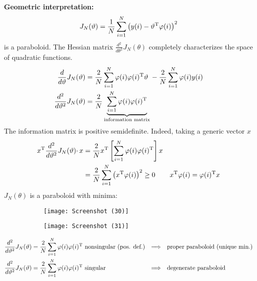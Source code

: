 \textbf{Geometric interpretation:}
\begin{equation*}
J_{N}(\vartheta) =\frac{1}{N}\sum _{i=1}^{N}\left(y(i) -\vartheta ^{\mathrm{T}} \varphi (i)\right)^{2}
\end{equation*}
is a paraboloid. The Hessian matrix $ \frac{d^{2}}{d\theta ^{2}} J_{N}(\theta)$ completely characterizes the space of quadratic functions.
\begin{align*}
\frac{d}{d\vartheta } J_{N}(\vartheta) & =\frac{2}{N}\sum _{i=1}^{N} \varphi (i) \varphi (i)^{\mathrm{T}} \vartheta \ -\frac{2}{N}\sum _{i=1}^{N} \varphi (i) y(i)\\
\frac{d^{2}}{d\vartheta ^{2}} J_{N}(\vartheta) & =\frac{2}{N}\underbrace{\sum _{i=1}^{N} \varphi (i) \varphi (i)^{\mathrm{T}}}_{\text{information matrix}}
\end{align*}
The information matrix is positive semidefinite. Indeed, taking a generic vector $x$
\begin{align*}
x^{\mathrm{T}}\frac{d^{2}}{d\vartheta ^{2}} J_{N}(\vartheta) \cdotp x & =\frac{2}{N} x^{\mathrm{T}}\left[\sum _{i=1}^{N} \varphi (i) \varphi (i)^{\mathrm{T}}\right] x & \\
 & =\frac{2}{N}\sum _{i=1}^{N}\left(x^{\mathrm{T}} \varphi (i)\right)^{2} \geq 0 & x^{\mathrm{T}} \varphi (i) =\varphi (i)^{\mathrm{T}} x
\end{align*}
$ J_{N}(\theta)$ is a paraboloid with minima:
\begin{figure}[htpb]
	\centering
	\begin{subfigure}{.5\textwidth}
		\centering
		\texttt{[image: Screenshot (30)]}
		\label{fig:test1}
	\end{subfigure}%
	\begin{subfigure}{.5\textwidth}
		\centering
		\texttt{[image: Screenshot (31)]}
		\label{fig:test2}
	\end{subfigure}
\end{figure}
\FloatBarrier
\begin{align*}
\frac{d^{2}}{d\vartheta ^{2}} J_{N}(\vartheta) & =\frac{2}{N}\sum _{i=1}^{N} \varphi (i) \varphi (i)^{\mathrm{T}} \text{ nonsingular (pos. def.)} & \Longrightarrow\quad& \text{proper paraboloid (unique min.)}\\
\frac{d^{2}}{d\vartheta ^{2}} J_{N}(\vartheta) & =\frac{2}{N}\sum _{i=1}^{N} \varphi (i) \varphi (i)^{\mathrm{T}} \text{ singular} &\Longrightarrow\quad& \text{degenerate paraboloid}
\end{align*}

